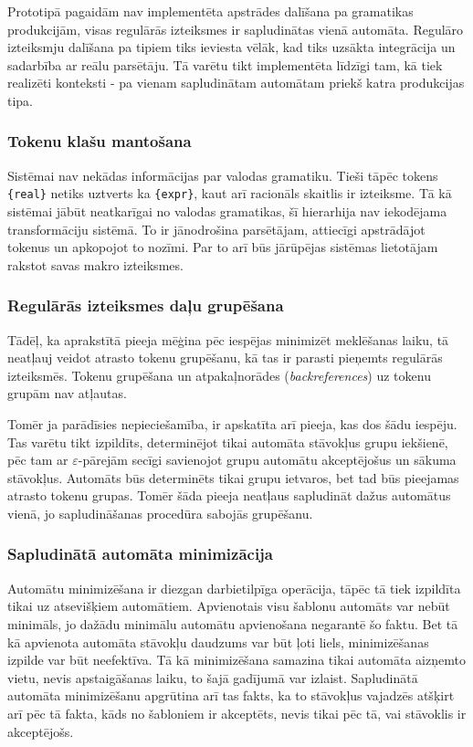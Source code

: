 Prototipā pagaidām nav implementēta apstrādes dalīšana pa gramatikas produkcijām, visas regulārās izteiksmes ir sapludinātas vienā automāta. Regulāro izteiksmju dalīšana pa tipiem tiks ieviesta vēlāk, kad tiks uzsākta integrācija un sadarbība ar reālu parsētāju. Tā varētu tikt implementēta līdzīgi tam, kā tiek realizēti konteksti - pa vienam sapludinātam automātam priekš katra produkcijas tipa.

\subsubsection{Tokenu klašu mantošana}

Sistēmai nav nekādas informācijas par valodas gramatiku. Tieši tāpēc tokens \verb|{real}| netiks uztverts ka \verb|{expr}|, kaut arī racionāls skaitlis ir izteiksme. Tā kā sistēmai jābūt neatkarīgai no valodas gramatikas, šī hierarhija nav iekodējama transformāciju sistēmā. To ir jānodrošina parsētājam, attiecīgi apstrādājot tokenus un apkopojot to nozīmi. Par to arī būs jārūpējas sistēmas lietotājam rakstot savas makro izteiksmes.

\subsubsection{Regulārās izteiksmes daļu grupēšana}

Tādēļ, ka aprakstītā pieeja mēģina pēc iespējas minimizēt meklēšanas laiku, tā neatļauj veidot atrasto tokenu grupēšanu, kā tas ir parasti pieņemts regulārās izteiksmēs. Tokenu grupēšana un atpakaļnorādes (\emph{backreferences}) uz tokenu grupām nav atļautas.

Tomēr ja parādīsies nepieciešamība, ir apskatīta arī pieeja, kas dos šādu iespēju. Tas varētu tikt izpildīts, determinējot tikai automāta stāvokļus grupu iekšienē, pēc tam ar $\varepsilon$-pārejām secīgi savienojot grupu automātu akceptējošus un sākuma stāvokļus. Automāts būs determinēts tikai grupu ietvaros, bet tad būs pieejamas atrasto tokenu grupas. Tomēr šāda pieeja neatļaus sapludināt dažus automātus vienā, jo sapludināšanas procedūra sabojās grupēšanu.

\subsubsection{Sapludinātā automāta minimizācija}

Automātu minimizēšana ir diezgan darbietilpīga operācija, tāpēc tā tiek izpildīta tikai uz atsevišķiem automātiem. Apvienotais visu šablonu automāts var nebūt minimāls, jo dažādu minimālu automātu apvienošana negarantē šo faktu. Bet tā kā apvienota automāta stāvokļu daudzums var būt ļoti liels, minimizēšanas izpilde var būt neefektīva. Tā kā minimizēšana samazina tikai automāta aizņemto vietu, nevis apstaigāšanas laiku, to šajā gadījumā var izlaist. Sapludinātā automāta minimizēšanu apgrūtina arī tas fakts, ka to stāvokļus vajadzēs atšķirt arī pēc tā fakta, kāds no šabloniem ir akceptēts, nevis tikai pēc tā, vai stāvoklis ir akceptējošs.

